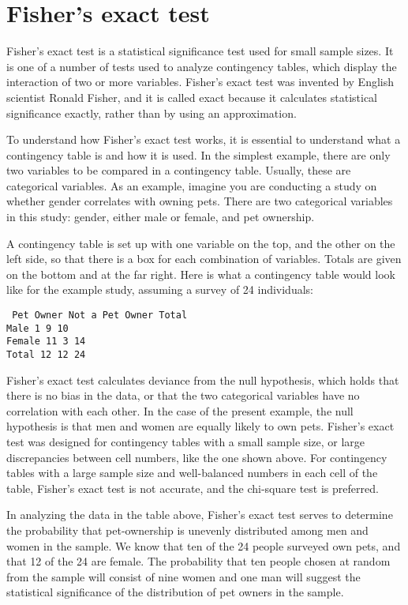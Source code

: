 \section{Fisher's exact test}

Fisher's exact test is a statistical significance test used for small sample sizes. It is one of a number of tests used to analyze contingency tables, which display the interaction of two or more variables. Fisher's exact test was invented by English scientist Ronald Fisher, and it is called exact because it calculates statistical significance exactly, rather than by using an approximation.

To understand how Fisher's exact test works, it is essential to understand what a contingency table is and how it is used. In the simplest example, there are only two variables to be compared in a contingency table. Usually, these are categorical variables. As an example, imagine you are conducting a study on whether gender correlates with owning pets. There are two categorical variables in this study: gender, either male or female, and pet ownership.

A contingency table is set up with one variable on the top, and the other on the left side, so that there is a box for each combination of variables. Totals are given on the bottom and at the far right. Here is what a contingency table would look like for the example study, assuming a survey of 24 individuals:
\begin{verbatim}
 Pet Owner Not a Pet Owner Total
Male 1 9 10
Female 11 3 14
Total 12 12 24
\end{verbatim}
Fisher's exact test calculates deviance from the null hypothesis, which holds that there is no bias in the data, or that the two categorical variables have no correlation with each other. In the case of the present example, the null hypothesis is that men and women are equally likely to own pets. Fisher's exact test was designed for contingency tables with a small sample size, or large discrepancies between cell numbers, like the one shown above. For contingency tables with a large sample size and well-balanced numbers in each cell of the table, Fisher's exact test is not accurate, and the chi-square test is preferred.

In analyzing the data in the table above, Fisher's exact test serves to determine the probability that pet-ownership is unevenly distributed among men and women in the sample. We know that ten of the 24 people surveyed own pets, and that 12 of the 24 are female. The probability that ten people chosen at random from the sample will consist of nine women and one man will suggest the statistical significance of the distribution of pet owners in the sample.

